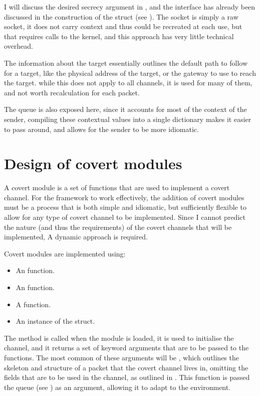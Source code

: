 I will discuss the desired secrecy argument in , and the interface has already been discussed in the construction of the  struct (see ). The socket is simply a raw socket, it does not carry context and thus could be recreated at each use, but that requires calls to the kernel, and this approach has very little technical overhead.

The information about the target essentially outlines the default path to follow for a target, like the physical address of the target, or the gateway to use to reach the target. while this does not apply to all channels, it is used for many of them, and not worth recalculation for each packet.

The queue is also exposed here, since it accounts for most of the context of the sender, compiling these contextual values into a single dictionary makes it easier to pass around, and allows for the sender to be more idiomatic.

\section{Design of covert modules}
\label{sec:covert_modules}

A covert module is a set of functions that are used to implement a covert channel. For the framework to work effectively, the addition of covert modules must be a process that is both simple and idiomatic, but sufficiently flexible to allow for any type of covert channel to be implemented. Since I cannot predict the nature (and thus the requirements) of the covert channels that will be implemented, A dynamic approach is required.

Covert modules are implemented using:
\begin{itemize}
    \item An  function.
    \item An  function.
    \item A  function.
    \item An instance of the  struct.
\end{itemize}

The  method is called when the module is loaded, it is used to initialise the channel, and it returns a set of keyword arguments that are to be passed to the  functions. The most common of these arguments will be , which outlines the skeleton and structure of a packet that the covert channel lives in, omitting the fields that are to be used in the channel, as outlined in . This function is passed the queue (see ) as an argument, allowing it to adapt to the environment.

